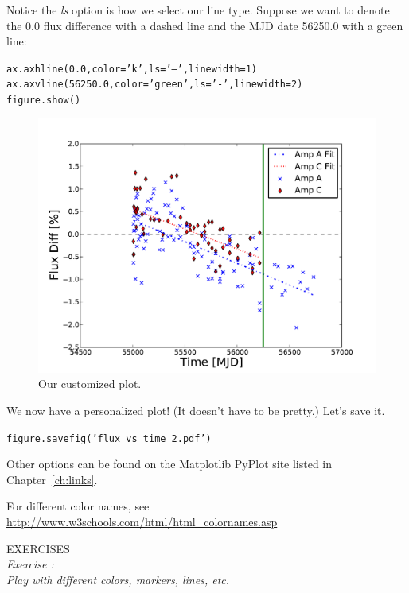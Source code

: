Notice the \textit{ls} option is how we select our line type. 
Suppose we want to denote the 0.0 flux difference with a dashed line and the
MJD date 56250.0 with a green line:

\begin{alltt}
\pytab ax.axhline(0.0, color='k', ls='--', linewidth=1)  
\pytab ax.axvline(56250.0, color='green', ls='-', linewidth=2) 
\pytab figure.show()
\end{alltt}

\begin{figure}[tbp]
  \centering
    \includegraphics[scale=0.55]{flux_vs_time_2.pdf}
    \caption{Our customized plot.}
  \label{fig:flux_vs_time_2}
\end{figure}

We now have a personalized plot! (It doesn't have to be pretty.) Let's save it.

\begin{alltt}
\pytab figure.savefig('flux_vs_time_2.pdf')
\end{alltt}

Other options can be found on the Matplotlib PyPlot site listed in Chapter~\ref{ch:links}. 

For different color names, see \href{http://www.w3schools.com/html/html_colornames.asp}
{http://www.w3schools.com/html/html\_colornames.asp}

{\color{blue} {\sf\small EXERCISES}} \\
{\it Exercise  :  \\
Play with different colors, markers, lines, etc.}


